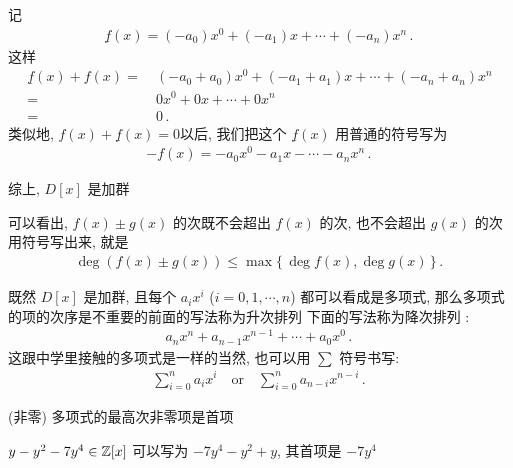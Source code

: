 \begin{pf}
    记
    \begin{align*}
        \underline{f}(x) = (-a_0) x^0 + (-a_1) x + \cdots + (-a_n) x^n \period
    \end{align*}
    这样
    \begin{align*}
        \underline{f}(x) + f(x)
        = \  & (-a_0 + a_0) x^0 + (-a_1 + a_1) x + \cdots + (-a_n + a_n) x^n \\
        = \  & 0 x^0 + 0 x + \cdots + 0 x^n                                  \\
        = \  & 0 \period
    \end{align*}
    类似地, $f(x) + \underline{f}(x) = 0$\period 以后, 我们把这个 $\underline{f}(x)$ 用普通的符号写为
    \begin{align*}
        -f(x) = -a_0 x^0 - a_1 x - \cdots - a_n x^n \period
    \end{align*}

    综上, $D[x]$ 是加群\period
\end{pf}

\begin{remark}
    可以看出, $f(x) \pm g(x)$ 的次既不会超出 $f(x)$ 的次, 也不会超出 $g(x)$ 的次\period 用符号写出来, 就是
    \begin{align*}
        \deg (f(x) \pm g(x)) \leq \max \{\, \deg f(x), \deg g(x) \,\} \period
    \end{align*}
\end{remark}

\begin{remark}
    既然 $D[x]$ 是加群, 且每个 $a_i x^i$ ($i = 0,1,\cdots,n$) 都可以看成是多项式, 那么多项式的项的次序是不重要的\period 前面的写法称为升次排列 \period 下面的写法称为降次排列 :
    \begin{align*}
        a_n x^n + a_{n-1} x^{n-1} + \cdots + a_0 x^0 \period
    \end{align*}
    这跟中学里接触的多项式是一样的\period 当然, 也可以用 $\sum$ 符号书写:
    \begin{align*}
        \sum_{i = 0}^{n} a_i x^i \quad \text{or} \quad \sum_{i = 0}^{n} a_{n-i} x^{n-i} \period
    \end{align*}

    (非零) 多项式的最高次非零项是首项 \period
\end{remark}

\begin{example}
    $y - y^2 - 7y^4 \in \mathbb{Z}[x]$ 可以写为 $-7y^4 - y^2 + y$, 其首项是 $-7y^4$\period
\end{example}

